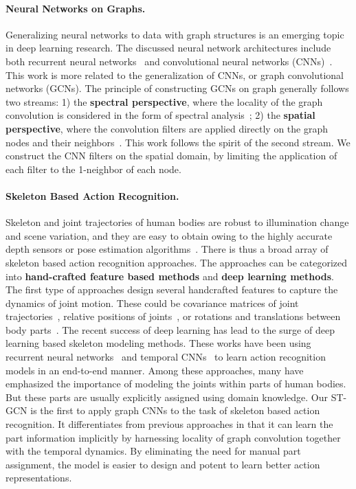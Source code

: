 \documentclass[letterpaper]{article} \usepackage{aaai18}  \usepackage{times}  \usepackage{helvet}  \usepackage{courier}  \usepackage{url}  \usepackage{graphicx}
\begin{document}
\paragraph{Neural Networks on Graphs.}
Generalizing neural networks to data with graph structures is an emerging topic in deep learning research.
The discussed neural network architectures include both recurrent neural networks~\cite{Tai2015ACL,Van2016Pixel} and convolutional neural networks (CNNs)~\cite{Bruna2014ICLR,Henaff2015Arxiv,Duvenaud2015NIPS,Li2016ICLR,Defferrard2016NIPS}.
This work is more related to the generalization of CNNs, or graph convolutional networks (GCNs).
The principle of constructing GCNs on graph generally follows two streams: 1) the \textbf{spectral perspective}, where the locality of the graph convolution is considered in the form of spectral analysis~\cite{Henaff2015Arxiv,Duvenaud2015NIPS,Li2016ICLR,Kipf2017ICLR}; 2) the \textbf{spatial perspective}, where the convolution filters are applied directly on the graph nodes and their neighbors~\cite{Bruna2014ICLR,Niepert2016ICML}.
This work follows the spirit of the second stream. We construct the CNN filters on the spatial domain, by limiting the application of each filter to the 1-neighbor of each node.

\paragraph{Skeleton Based Action Recognition.}
Skeleton and joint trajectories of human bodies are robust to illumination change and scene variation, and they are easy to obtain owing to the highly accurate depth sensors or pose estimation algorithms~\cite{Shotton2013CVPR,Cao2017CVPR}. There is thus a broad array of skeleton based action recognition approaches.
The approaches can be categorized into \textbf{hand-crafted feature based methods} and \textbf{deep learning methods}.
The first type of approaches design several handcrafted features to capture the dynamics of joint motion. These could be covariance matrices of joint trajectories~\cite{Hussein2013IJCAI}, relative positions of joints~\cite{Wang2012CVPR}, or rotations and translations between body parts~\cite{Vemulapalli2014CVPR}.
The recent success of deep learning has lead to the surge of deep learning based skeleton modeling methods. These works have been using recurrent neural networks~\cite{Shahroudy2016CVPR,Zhu2016AAAI,Liu2016ECCV,Zhang2017WACV} and temporal CNNs~\cite{Li2017Skeleton,Ke2017CVPR,Kim2017CVPRW} to learn action recognition models in an end-to-end manner.
Among these approaches, many have emphasized the importance of modeling the joints within parts of human bodies.
But these parts are usually explicitly assigned using domain knowledge.
Our ST-GCN is the first to apply graph CNNs to the task of skeleton based action recognition. It differentiates from previous approaches in that it can learn the part information implicitly by harnessing locality of graph convolution together with the temporal dynamics.
By eliminating the need for manual part assignment, the model is easier to design and potent to learn better action representations.
\end{document}
